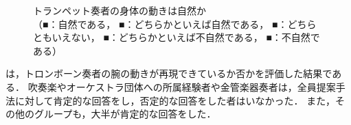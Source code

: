 \begin{figure}[!h]
	\centering
	\hspace{5mm}
	\hspace{5mm}
	\caption{トランペット奏者の身体の動きは自然か\\
		（{\color{legend1}■}：自然である，
		{\color{legend2}■}：どちらかといえば自然である，
		{\color{legend3}■}：どちらともいえない，
		{\color{legend4}■}：どちらかといえば不自然である，
		{\color{legend5}■}：不自然である）}
	\label{fig:Q1-2}
\end{figure}
\vspace{5mm}
\par
{}は，トロンボーン奏者の腕の動きが再現できているか否かを評価した結果である．
吹奏楽やオーケストラ団体への所属経験者や金管楽器奏者は，全員提案手法に対して肯定的な回答をし，否定的な回答をした者はいなかった．
また，その他のグループも，大半が肯定的な回答をした．
